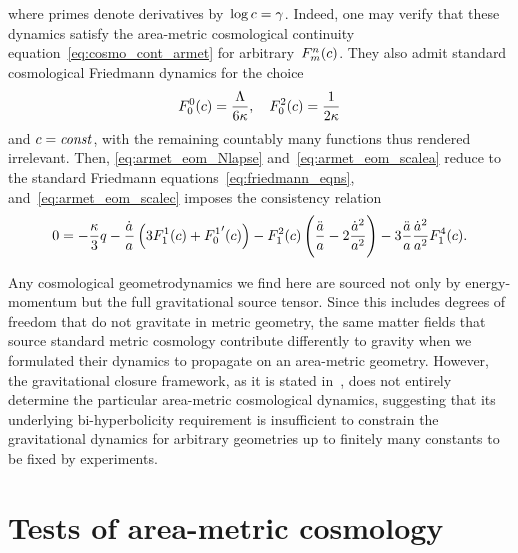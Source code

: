 where primes denote derivatives by~$\log{\scalec}=\lnc$. Indeed, one may verify that these dynamics satisfy the area-metric cosmological continuity equation~\eqref{eq:cosmo_cont_armet} for arbitrary~$\Func{\Nind}{\nind}\ofc$. They also admit standard cosmological Friedmann dynamics for the choice
\begin{equation}
	\Func{0}{0}\ofc=\frac{\cosmconst}{6\gravconst}, \quad \Func{2}{0}\ofc=\frac{1}{2\gravconst}
\end{equation}
and $\scalec=\const$, with the remaining countably many functions thus rendered irrelevant. Then, \eqref{eq:armet_eom_Nlapse} and~\eqref{eq:armet_eom_scalea} reduce to the standard Friedmann equations~\eqref{eq:friedmann_eqns}, and~\eqref{eq:armet_eom_scalec} imposes the consistency relation
\begin{equation}
	0=-\frac{\gravconst}{3}\q-\lndt{\scalea}\left(3\Func{1}{1}\ofc+\Func{1}{0}^\prime\ofc\right)-\Func{2}{1}\ofc\left(\frac{\ddt{\scalea}}{\scalea}-2\lndt[2]{\scalea}\right)-3\frac{\ddt{\scalea}}{\scalea}\lndt[2]{\scalea}\Func{4}{1}\ofc
	\eqpunct{.}
\end{equation}

Any cosmological geometrodynamics we find here are sourced not only by energy-momentum but the full gravitational source tensor. Since this includes degrees of freedom that do not gravitate in metric geometry, the same matter fields that source standard metric \FLRW{} cosmology contribute differently to gravity when we formulated their dynamics to propagate on an area-metric geometry. However, the gravitational closure framework, as it is stated in~\autocite{Schuller2016}, does not entirely determine the particular area-metric cosmological dynamics, suggesting that its underlying bi-hyperbolicity requirement is insufficient to constrain the gravitational dynamics for arbitrary geometries up to finitely many constants to be fixed by experiments.%


\chapter{Tests of area-metric cosmology}\label{sec:cosmo_tests}

